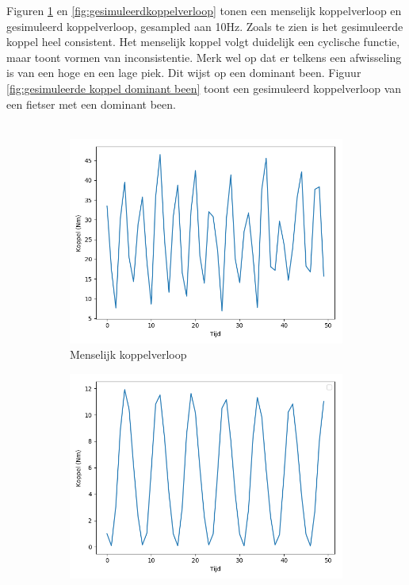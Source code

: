 Figuren \ref{fig:menselijkkoppelverloop} en \ref{fig:gesimuleerdkoppelverloop} tonen een menselijk koppelverloop en gesimuleerd koppelverloop, gesampled aan 10Hz. Zoals te zien is het gesimuleerde koppel heel consistent. Het menselijk koppel volgt duidelijk een cyclische functie, maar toont vormen van inconsistentie. Merk wel op dat er telkens een afwisseling is van een hoge en een lage piek. Dit wijst op een dominant been. Figuur \ref{fig:gesimuleerde koppel dominant been} toont een gesimuleerd koppelverloop van een fietser met een dominant been.
\\\\
\begin{figure}[t!]
\centering
\begin{subfigure}{.5\textwidth}
  \centering
  \includegraphics[width=\linewidth]{images/menselijkkoppel.png}
  \caption{Menselijk koppelverloop}
  \label{fig:menselijkkoppelverloop}
\end{subfigure}%
\begin{subfigure}{.5\textwidth}
  \centering
  \includegraphics[width=\linewidth]{images/gesimuleerdekoppel.png}

\end{subfigure}
\end{figure}

